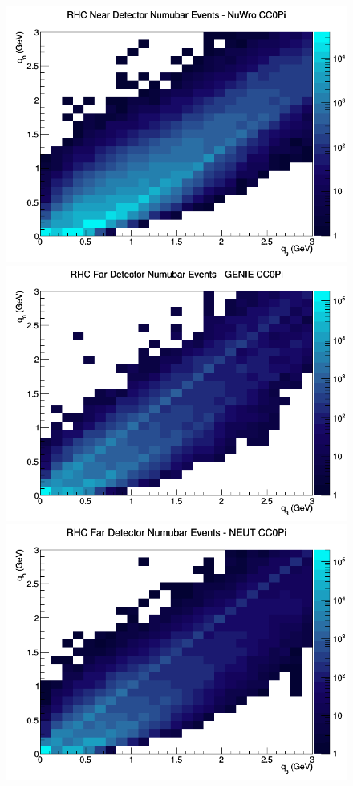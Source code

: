 \documentclass[12pt]{article}
\begin{document}
\begin{figure}[h]
\includegraphics[width=\linewidth]{eff_q0_q3/LAr/CC0Pi_RHC_ND_numubar_q3_q0_NuWro.png}
\endminipage
\newline
{}
\includegraphics[width=\linewidth]{eff_q0_q3/LAr/CC0Pi_RHC_FD_numubar_q3_q0_GENIE.png}
\endminipage
{}
\includegraphics[width=\linewidth]{eff_q0_q3/LAr/CC0Pi_RHC_FD_numubar_q3_q0_NEUT.png}

\end{figure}
\end{document}

